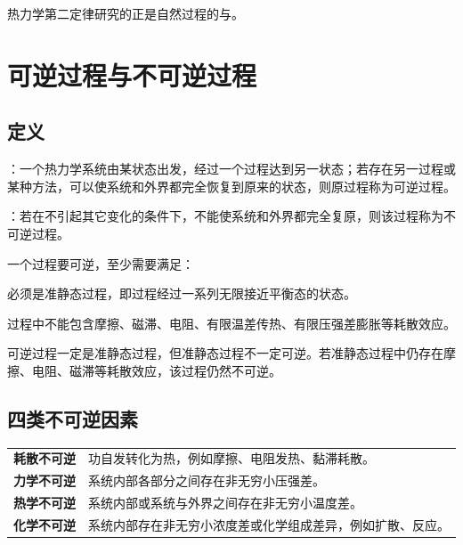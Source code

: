 热力学第二定律研究的正是自然过程的与。

\section{可逆过程与不可逆过程}

\subsection{定义}

：一个热力学系统由某状态出发，经过一个过程达到另一状态；若存在另一过程或某种方法，可以使系统和外界都完全恢复到原来的状态，则原过程称为可逆过程。

：若在不引起其它变化的条件下，不能使系统和外界都完全复原，则该过程称为不可逆过程。

\begin{FormulaBox}[可逆过程的条件]
一个过程要可逆，至少需要满足：
\begin{ReviewList}
  \item 必须是准静态过程，即过程经过一系列无限接近平衡态的状态。
  \item 过程中不能包含摩擦、磁滞、电阻、有限温差传热、有限压强差膨胀等耗散效应。
\end{ReviewList}
\end{FormulaBox}

\begin{WarnBox}
可逆过程一定是准静态过程，但准静态过程不一定可逆。若准静态过程中仍存在摩擦、电阻、磁滞等耗散效应，该过程仍然不可逆。
\end{WarnBox}

\subsection{四类不可逆因素}

\begin{KeyBox}[不可逆性的常见来源]
\begin{tabularx}{\textwidth}{@{}>{\bfseries}lX@{}}
耗散不可逆 & 功自发转化为热，例如摩擦、电阻发热、黏滞耗散。\\
力学不可逆 & 系统内部各部分之间存在非无穷小压强差。\\
热学不可逆 & 系统内部或系统与外界之间存在非无穷小温度差。\\
化学不可逆 & 系统内部存在非无穷小浓度差或化学组成差异，例如扩散、反应。\\
\end{tabularx}
\end{KeyBox}

